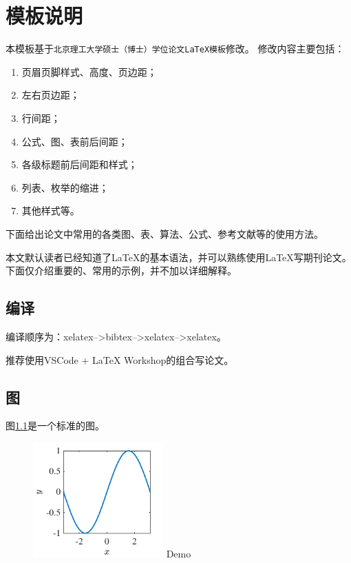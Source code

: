 
\chapter{模板说明}\label{c1:intro}

本模板基于\verb|北京理工大学硕士（博士）学位论文LaTeX模板|修改。
修改内容主要包括：
\begin{enumerate}
  \item 页眉页脚样式、高度、页边距；
  \item 左右页边距；
  \item 行间距；
  \item 公式、图、表前后间距；
  \item 各级标题前后间距和样式；
  \item 列表、枚举的缩进；
  \item 其他样式等。
\end{enumerate}

下面给出论文中常用的各类图、表、算法、公式、参考文献等的使用方法。

\begin{remark}
  本文默认读者已经知道了LaTeX的基本语法，并可以熟练使用LaTeX写期刊论文。
  下面仅介绍重要的、常用的示例，并不加以详细解释。
\end{remark}

\section{编译}

编译顺序为：xelatex-->bibtex-->xelatex-->xelatex。

推荐使用VSCode + LaTeX Workshop的组合写论文。

\section{图}\label{c1sec:figure}

图\ref{c1fig_demo1}是一个标准的图。
\begin{figure}[!htb]
  \centering
  \includegraphics[width=5cm]{figures/chapter1/fig_demo.pdf}
  {Demo}
  \label{c1fig_demo1}
\end{figure}

